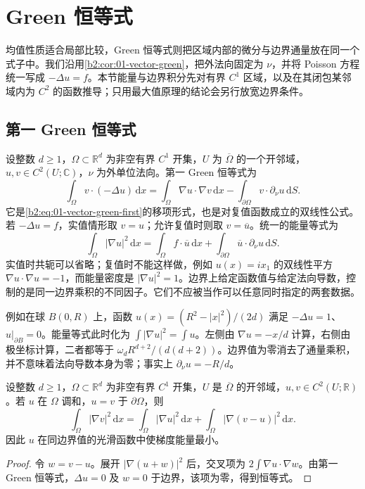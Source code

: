 \section{Green 恒等式}
\label{b2:sec:1302}

均值性质适合局部比较，Green 恒等式则把区域内部的微分与边界通量放在同一个式子中。我们沿用\cref{b2:cor:01-vector-green}，把外法向固定为 \(\nu\)，并将 Poisson 方程统一写成 \(-\Delta u=f\)。本节能量与边界积分先对有界 \(C^1\) 区域，以及在其闭包某邻域内为 \(C^2\) 的函数推导；只用最大值原理的结论会另行放宽边界条件。

\subsection{第一 Green 恒等式}
\label{b2:subsec:130201}

设整数 \(d\geq1\)，\(\Omega\subset\mathbb R^d\) 为非空有界 \(C^1\) 开集，\(U\) 为 \(\overline\Omega\) 的一个开邻域，\(u,v\in C^2(U;\mathbb C)\)，\(\nu\) 为外单位法向。第一 Green 恒等式为
\begin{equation}\label{b2:eq:13-green-first}
 \int_\Omega v\cdot(-\Delta u)\,\mathrm{d}x
 =\int_\Omega\nabla u\cdot\nabla v\,\mathrm{d}x
  -\int_{\partial\Omega}v\cdot\partial_\nu u\,\mathrm{d}S.
\end{equation}
它是\eqref{b2:eq:01-vector-green-first}的移项形式，也是对复值函数成立的双线性公式。若 \(-\Delta u=f\)，实值情形取 \(v=u\)；允许复值时则取 \(v=\overline u\)。统一的能量等式为
\[
 \int_\Omega|\nabla u|^2\,\mathrm{d}x
 =\int_\Omega f\cdot\overline u\,\mathrm{d}x
  +\int_{\partial\Omega}\overline u\cdot\partial_\nu u\,\mathrm{d}S.
\]
实值时共轭可以省略；复值时不能这样做，例如 \(u(x)=ix_1\) 的双线性平方 \(\nabla u\cdot\nabla u=-1\)，而能量密度是 \(|\nabla u|^2=1\)。边界上给定函数值与给定法向导数，控制的是同一边界乘积的不同因子。它们不应被当作可以任意同时指定的两套数据。

\ProseParagraphBreak

例如在球 \(B(0,R)\) 上，函数 \(u(x)=(R^2-|x|^2)/(2d)\) 满足 \(-\Delta u=1\)、\(u|_{\partial B}=0\)。能量等式此时化为 \(\int|\nabla u|^2=\int u\)。左侧由 \(\nabla u=-x/d\) 计算，右侧由极坐标计算，二者都等于 \(\omega_dR^{d+2}/(d(d+2))\)。边界值为零消去了通量乘积，并不意味着法向导数本身为零；事实上 \(\partial_\nu u=-R/d\)。

\begin{proposition}\label{b2:prop:13-dirichlet-energy}
设整数 \(d\geq1\)，\(\Omega\subset\mathbb R^d\) 为非空有界 \(C^1\) 开集，\(U\) 是 \(\overline\Omega\) 的开邻域，\(u,v\in C^2(U;\mathbb R)\)。若 \(u\) 在 \(\Omega\) 调和，\(u=v\) 于 \(\partial\Omega\)，则
\[
 \int_\Omega|\nabla v|^2\,\mathrm{d}x
 =\int_\Omega|\nabla u|^2\,\mathrm{d}x
  +\int_\Omega|\nabla(v-u)|^2\,\mathrm{d}x.
\]
因此 \(u\) 在同边界值的光滑函数中使梯度能量最小。
\end{proposition}
\begin{proof}
令 \(w=v-u\)。展开 \(|\nabla(u+w)|^2\) 后，交叉项为 \(2\int\nabla u\cdot\nabla w\)。由第一 Green 恒等式，\(\Delta u=0\) 及 \(w=0\) 于边界，该项为零，得到恒等式。
\end{proof}

